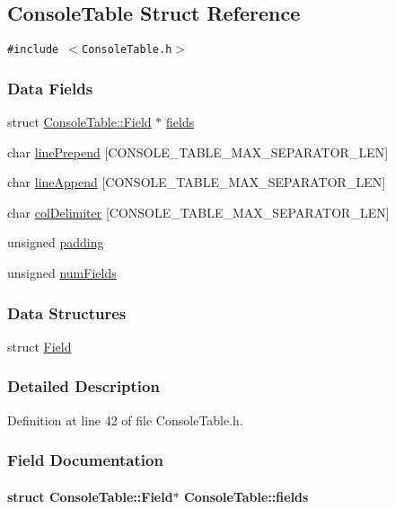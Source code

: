 \hypertarget{structConsoleTable}{
\subsection{ConsoleTable Struct Reference}
\label{structConsoleTable}
}
{\tt \#include $<$ConsoleTable.h$>$}

\subsubsection*{Data Fields}
\begin{CompactItemize}
\item 
struct \hyperlink{structConsoleTable_1_1Field}{ConsoleTable::Field} $\ast$ \hyperlink{structConsoleTable_e7c6bfb06cc0c2f0bca712b3db6d8113}{fields}
\item 
char \hyperlink{structConsoleTable_c6553b14348f21dd83635c318d106921}{linePrepend} \mbox{[}CONSOLE\_\-TABLE\_\-MAX\_\-SEPARATOR\_\-LEN\mbox{]}
\item 
char \hyperlink{structConsoleTable_0332a0e30c5f5d3a21a5710a5c2640b6}{lineAppend} \mbox{[}CONSOLE\_\-TABLE\_\-MAX\_\-SEPARATOR\_\-LEN\mbox{]}
\item 
char \hyperlink{structConsoleTable_73978b933e863125fe7b27105ca6597a}{colDelimiter} \mbox{[}CONSOLE\_\-TABLE\_\-MAX\_\-SEPARATOR\_\-LEN\mbox{]}
\item 
unsigned \hyperlink{structConsoleTable_1e9951fcb5c5c2899ab1df4713245946}{padding}
\item 
unsigned \hyperlink{structConsoleTable_b82ba43aaff40eda8add81e660bbe289}{numFields}
\end{CompactItemize}
\subsubsection*{Data Structures}
\begin{CompactItemize}
\item 
struct \hyperlink{structConsoleTable_1_1Field}{Field}
\end{CompactItemize}


\subsubsection{Detailed Description}


Definition at line 42 of file ConsoleTable.h.

\subsubsection{Field Documentation}
\hypertarget{structConsoleTable_e7c6bfb06cc0c2f0bca712b3db6d8113}{
\paragraph[fields]{\setlength{\rightskip}{0pt plus 5cm}struct {\bf ConsoleTable::Field}$\ast$  {\bf ConsoleTable::fields}}\hfill}
\label{structConsoleTable_e7c6bfb06cc0c2f0bca712b3db6d8113}




